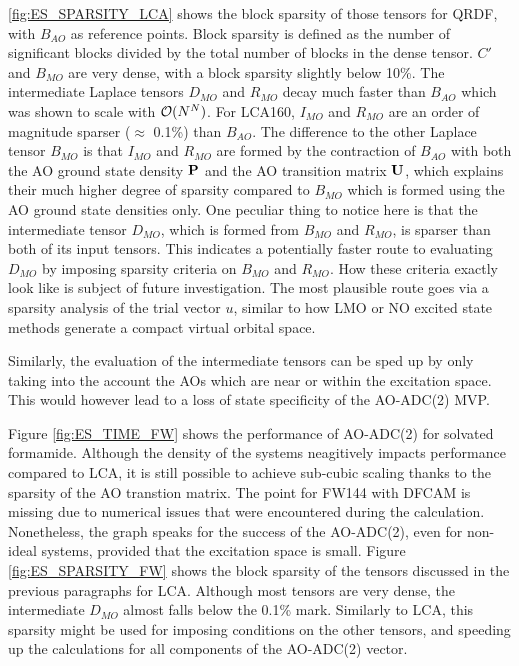 \ref{fig:ES_SPARSITY_LCA} shows the block sparsity of those tensors for QRDF, with $B_{AO}$ as reference points. Block sparsity is defined as the number of significant blocks divided by the total number of blocks in the dense tensor. $C'$ and $B_{MO}$ are very dense, with a block sparsity slightly below 10\%. The intermediate Laplace tensors $D_{MO}$ and $R_{MO}$ decay much faster than $B_{AO}$ which was shown to scale with $\mathcal{O}(N^{N})$. For LCA160, $I_{MO}$ and $R_{MO}$ are an order of magnitude sparser ($\approx$ 0.1\%) than $B_{AO}$. The difference to the other Laplace tensor $B_{MO}$ is that $I_{MO}$ and $R_{MO}$ are formed by the contraction of $B_{AO}$ with both the AO ground state density $\mathbf{P}$ and the AO transition matrix $\mathbf{U}$, which explains their much higher degree of sparsity compared to $B_{MO}$ which is formed using the AO ground state densities only. One peculiar thing to notice here is that the intermediate tensor $D_{MO}$, which is formed from $B_{MO}$ and $R_{MO}$, is sparser than both of its input tensors. This indicates a potentially faster route to evaluating $D_{MO}$ by imposing sparsity criteria on $B_{MO}$ and $R_{MO}$. How these criteria exactly look like is subject of future investigation. The most plausible route goes via a sparsity analysis of the trial vector $u$, similar to how LMO or NO excited state methods generate a compact virtual orbital space.

Similarly, the evaluation of the intermediate tensors can be sped up by only taking into the account the AOs which are near or within the excitation space. This would however lead to a loss of state specificity of the AO-ADC(2) MVP. 

Figure \ref{fig:ES_TIME_FW} shows the performance of AO-ADC(2) for solvated formamide. Although the density of the systems neagitively impacts performance compared to LCA, it is still possible to achieve sub-cubic scaling thanks to the sparsity of the AO transtion matrix. The point for FW144 with DFCAM is missing due to numerical issues that were encountered during the calculation. Nonetheless, the graph speaks for the success of the AO-ADC(2), even for non-ideal systems, provided that the excitation space is small. Figure \ref{fig:ES_SPARSITY_FW} shows the block sparsity of the tensors discussed in the previous paragraphs for LCA. Although most tensors are very dense, the intermediate $D_{MO}$ almost falls below the 0.1\% mark. Similarly to LCA, this sparsity might be used for imposing conditions on the other tensors, and speeding up the calculations for all components of the AO-ADC(2) vector. 

